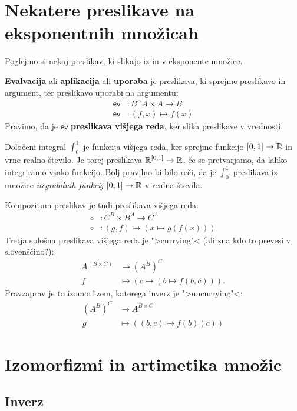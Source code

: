 \section{Nekatere preslikave na eksponentnih množicah}

Poglejmo si nekaj preslikav, ki slikajo iz in v eksponente množice.

\textbf{Evalvacija} ali \textbf{aplikacija} ali \textbf{uporaba} je preslikava, ki sprejme preslikavo in argument, ter preslikavo uporabi na argumentu:
%
\begin{align*}
  \mathsf{ev} &: B\^A \times A \to B \\
  \mathsf{ev} &: (f, x) \mapsto f(x)
\end{align*}
%
Pravimo, da je $\mathsf{ev}$ \textbf{preslikava višjega reda}, ker slika preslikave v vrednosti.

\begin{primer}
  Določeni integral $\int_0^1$ je funkcija višjega reda, ker
  sprejme funkcijo $[0,1] \to \mathbb{R}$ in vrne realno število. Je torej preslikava
  $\mathbb{R}^{[0,1]} \to \mathbb{R}$, če se pretvarjamo, da lahko integriramo vsako funkcijo.
  Bolj pravilno bi bilo reči, da je $\int_0^1$ preslikava iz množice \emph{itegrabilnih funkcij $[0,1] \to \mathbb{R}$} v realna števila.
\end{primer}

Kompozitum preslikav je tudi preslikava višjega reda:
%
\begin{align*}
    {\circ} &: C^B \times B^A \to C^A \\
    {\circ} &: (g, f) \mapsto (x \mapsto g(f(x)))
\end{align*}
%
Tretja splošna preslikava višjega reda je ">currying"< (ali zna kdo to prevesi v slovenščino?):
%
\begin{align*}
  A^(B \times C) &\to (A^B)^C \\
  f &\mapsto (c \mapsto (b \mapsto f(b, c))).
\end{align*}
%
Pravzaprav je to izomorfizem, katerega inverz je ">uncurrying"<:
%
\begin{align*}
  (A^B)^C &\to A^{B \times C} \\
  g       &\mapsto ((b, c) \mapsto f(b)(c))
\end{align*}


\section{Izomorfizmi in artimetika množic}

\subsection{Inverz}

